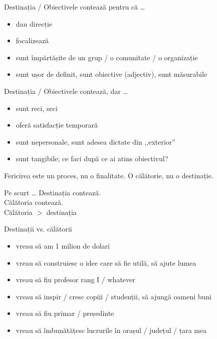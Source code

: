 \documentclass{simple}
\begin{document}
\begin{frame}{Destinația / Obiectivele contează pentru că \ldots}
  \begin{itemize}
    \pause
    \item dau direcție
    \pause
    \item focalizează
    \pause
    \item sunt împărtășite de un grup / o comunitate / o organizație
    \pause
    \item sunt ușor de definit, sunt obiective (adjectiv), sunt măsurabile
  \end{itemize}
\end{frame}

\begin{frame}{Destinația / Obiectivele contează, dar \ldots}
  \begin{itemize}
    \pause
    \item sunt reci, seci
    \pause
    \item oferă satisfacție temporară
    \pause
    \item sunt nepersonale, sunt adesea dictate din ,,exterior''
    \pause
    \item sunt tangibile; ce faci după ce ai atins obiectivul?
  \end{itemize}
\end{frame}

\begin{frame}{}
  \centering
  \LARGE
  Fericirea este un proces, nu o finalitate. O călătorie, nu o destinație.
\end{frame}

\begin{frame}{Pe scurt \ldots}
  \centering
  \LARGE
  \pause
  Destinația contează. \\
  \pause
  Călătoria contează. \\
  \pause
  Călătoria $>$ destinația
\end{frame}

\begin{frame}{Destinații vs. călătorii}
  \begin{itemize}
    \pause
    \item vreau să am 1 milion de dolari
    \pause
    \item vreau să construiesc o idee care să fie utilă, să ajute lumea
  \end{itemize}
  \begin{itemize}
    \pause
    \item vreau să fiu profesor rang I / whatever
    \pause
    \item vreau să inspir / cresc copiii / studenții, să ajungă oameni buni
  \end{itemize}
  \begin{itemize}
    \pause
    \item vreau să fiu primar / președinte
    \pause
    \item vreau să îmbunătățesc lucrurile în orașul / județul / țara mea
  \end{itemize}
\end{frame}
\end{document}
